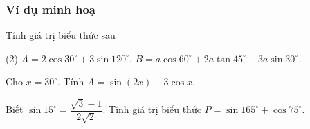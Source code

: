 \subsubsection{Ví dụ minh hoạ}
\begin{vd}%
	Tính giá trị biểu thức sau
	\begin{tasks}(2)
		\task $A= 2\cos 30^\circ+3\sin 120^\circ$.
		\task $B=a\cos60^{\circ}+2a\tan45^{\circ}-3a\sin30^{\circ}$.
	\end{tasks}
\end{vd}
\begin{vd}%
	Cho $x=30^{\circ}$. Tính $A=\sin (2x)-3\cos x$.
\end{vd}

\begin{vd}
	Biết $\sin15^\circ=\dfrac{\sqrt{3}-1}{2\sqrt{2}}$. Tính giá trị biểu thức $P=\sin165^\circ+\cos75^\circ$.
\end{vd}

